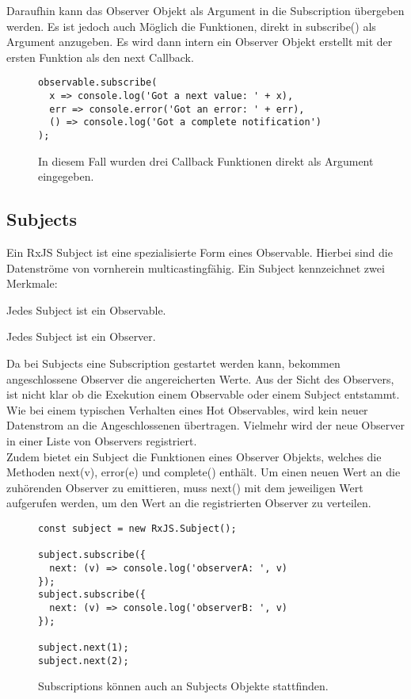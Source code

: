 \noindent
Daraufhin kann das Observer Objekt als Argument in die Subscription übergeben werden. Es ist jedoch auch Möglich die Funktionen, direkt in subscribe() als Argument anzugeben. Es wird dann intern ein Observer Objekt erstellt mit der ersten Funktion als den next Callback.

\begin{figure}[H]
\begin{lstlisting}[basicstyle=\small]
observable.subscribe(
  x => console.log('Got a next value: ' + x),
  err => console.error('Got an error: ' + err),
  () => console.log('Got a complete notification')
);
\end{lstlisting}
\caption{In diesem Fall wurden drei Callback Funktionen direkt als Argument eingegeben.}
\end{figure}

\subsection{Subjects}

Ein RxJS Subject ist eine spezialisierte Form eines Observable. Hierbei sind die Datenströme von vornherein multicastingfähig. Ein Subject kennzeichnet zwei Merkmale:

\begin{description}
\item Jedes Subject ist ein Observable.
\item Jedes Subject ist ein Observer.
\end{description}

\noindent
Da bei Subjects eine Subscription gestartet werden kann, bekommen angeschlossene Observer die angereicherten Werte. Aus der Sicht des Observers, ist nicht klar ob die Exekution einem Observable oder einem Subject entstammt. Wie bei einem typischen Verhalten eines Hot Observables, wird kein neuer Datenstrom an die Angeschlossenen übertragen. Vielmehr wird der neue Observer in einer Liste von Observers registriert.\\

\noindent
Zudem bietet ein Subject die Funktionen eines Observer Objekts, welches die Methoden next(v), error(e) und complete() enthält. Um einen neuen Wert an die zuhörenden Observer zu emittieren, muss next() mit dem jeweiligen Wert aufgerufen werden, um den Wert an die registrierten Observer zu verteilen.

\begin{figure}[H]
\begin{lstlisting}[basicstyle=\small]
const subject = new RxJS.Subject();

subject.subscribe({
  next: (v) => console.log('observerA: ', v)
});
subject.subscribe({
  next: (v) => console.log('observerB: ', v)
});

subject.next(1);
subject.next(2);
\end{lstlisting}
\caption{Subscriptions können auch an Subjects Objekte stattfinden.}
\end{figure}

